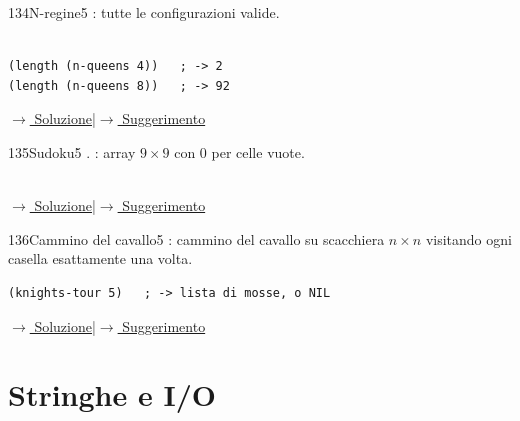 \label{ex:134}
\begin{stdbox}{134}{N-regine}{5}
 : tutte le configurazioni valide.\\\\
\nopagebreak
\begin{lstlisting}
(length (n-queens 4))   ; -> 2
(length (n-queens 8))   ; -> 92
\end{lstlisting}

\small\color{black!55}\hyperref[sol:134]{$\rightarrow$ Soluzione}\enspace\textcolor{black!30}{|}\enspace\hyperref[hint:134]{$\rightarrow$ Suggerimento}\normalsize\color{black}
\end{stdbox}

\label{ex:135}
\begin{colbox}{135}{Sudoku}{5}
 .
: array $9 \times 9$ con 0 per celle vuote.\\\\

\small\color{black!55}\hyperref[sol:135]{$\rightarrow$ Soluzione}\enspace\textcolor{black!30}{|}\enspace\hyperref[hint:135]{$\rightarrow$ Suggerimento}\normalsize\color{black}
\end{colbox}

\label{ex:136}
\begin{colbox}{136}{Cammino del cavallo}{5}
 : cammino del cavallo su
scacchiera $n \times n$ visitando ogni casella esattamente una volta.
\begin{lstlisting}
(knights-tour 5)   ; -> lista di mosse, o NIL
\end{lstlisting}



\small\color{black!55}\hyperref[sol:136]{$\rightarrow$ Soluzione}\enspace\textcolor{black!30}{|}\enspace\hyperref[hint:136]{$\rightarrow$ Suggerimento}\normalsize\color{black}
\end{colbox}

\setcounter{section}{7}
\section{Stringhe e I/O}

